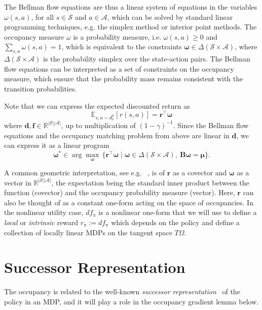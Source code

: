 \documentclass{article}
\theoremstyle{plain}
\theoremstyle{definition}
\theoremstyle{remark}
\newcommand{\sS}{\mathcal{S}}
\newcommand{\sA}{\mathcal{A}}
\begin{document}
The Bellman flow equations are thus a linear system of equations in the variables $\omega(s,a)$, for all $s\in\mathcal{S}$ and $a\in\mathcal{A}$, which can be solved by standard linear programming techniques, e.g. the simplex method or interior point methods.
The occupancy measure $\omega$ is a probability measure, i.e. $\omega(s,a)\ge 0$ and $\sum_{s,a}\omega(s,a)=1$, which is equivalent to the constraints $\boldsymbol{\omega} \in \Delta(\sS\times\sA)$, where $\Delta(\sS\times\sA)$ is the probability simplex over the state-action pairs.
The Bellman flow equations can be interpreted as a set of constraints on the occupancy measure, which
ensure that the probability mass remains consistent with the transition probabilities. 

Note that we can express the expected discounted return as
\begin{equation}\mathbb{E}_{s, a \sim d^\mu_\pi} [r(s, a)] = \boldsymbol{r}^\top \boldsymbol{\omega}\end{equation}
where $\boldsymbol{d},\boldsymbol{f}\in\mathbb{R}^{|\sS||\sA|}$, up to multiplication of $(1-\gamma)^{-1}$. 
Since the Bellman flow equations and the occupancy matching problem from above are linear in $\boldsymbol{d}$, we can express it as a linear program
\begin{equation}\label{eq:lin-mdp-vector}
    \boldsymbol{\omega^*} \in \arg \max_{\boldsymbol{\omega}}\, \{\boldsymbol{r}^\top \boldsymbol{\omega}
    \mid \boldsymbol{\omega} \in \Delta(\sS\times\sA),\ \boldsymbol{B}\boldsymbol{\omega}=\boldsymbol{\mu}\}.
\end{equation}

A common geometric interpretation, see e.g. ~\citep{ay2017information}, is of $\boldsymbol{r}$ as a covector and $\boldsymbol{\omega}$ as a vector in $\mathbb{R}^{|\mathcal{S}||\mathcal{A}|}$, the expectation being the standard inner product between the function (covector) and the occupancy probability measure (vector). Here, $\boldsymbol{r}$ can also be thought of as a constant one-form acting on the space of occupancies.
In the nonlinear utility case, $df_\pi$ is a nonlinear one-form that we will use to define a \emph{local} or \emph{intrinsic} reward $r_\pi := df_\pi$ which depends on the policy and define a collection of locally linear MDPs on the tangent space $T\Omega$.

\section{Successor Representation} 
The occupancy is related to the well-known \emph{successor representation}~\citep{dayan1993improving} of the policy in an MDP, and it will play a role in the occupancy gradient lemma below.
\end{document}
